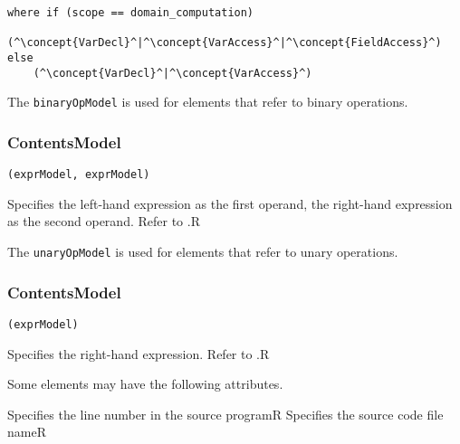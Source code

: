 \begin{lstlisting}[style=default,frame=none]
where if (scope == domain_computation)    
    (^\concept{VarDecl}^|^\concept{VarAccess}^|^\concept{FieldAccess}^)
else
    (^\concept{VarDecl}^|^\concept{VarAccess}^)
\end{lstlisting}


The {\tt binaryOpModel} is used for elements that refer to binary operations.


\subsubsection*{ContentsModel}{}

\begin{lstlisting}[style=default,frame=none]
(exprModel, exprModel)
\end{lstlisting}

\begin{HIRChildElements}
	{Specifies the left-hand expression as the first operand, the right-hand 
	 expression as the second operand. Refer to .}{R}
\end{HIRChildElements}

The {\tt unaryOpModel} is used for elements that refer to unary operations.


\subsubsection*{ContentsModel}{}

\begin{lstlisting}[style=default,frame=none]
(exprModel)
\end{lstlisting}

\begin{HIRChildElements}
	{Specifies the right-hand expression. Refer to .}{R}
\end{HIRChildElements}


Some elements may have the following attributes. 
\begin{HIRAttributes}
    {Specifies the line number in the source program}{R}
    {Specifies the source code file name}{R}
\end{HIRAttributes}

